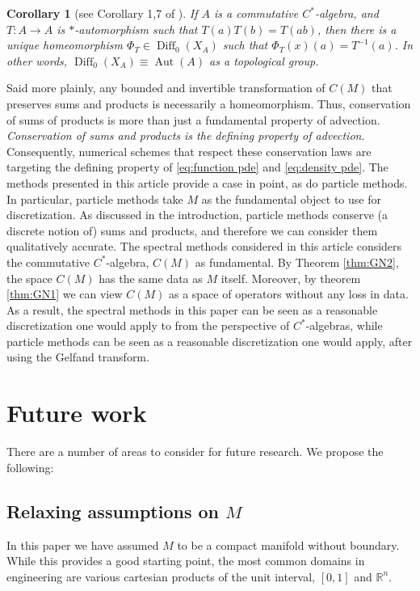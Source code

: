 \documentclass[12pt]{amsart}
\newtheorem{cor}[thm]{Corollary}
\DeclareMathOperator{\Diff}{Diff}
\begin{document}
\begin{cor}[see Corollary 1,7 of \cite{Bondia2001}]
	If $A$ is a commutative $C^{*}$-algebra, and $T:A\to A$ is $*$-automorphism such that $T(a)T(b) = T(ab)$,
	then there is a unique homeomorphism $\Phi_{T} \in \Diff_{0}(X_{A})$
	such that $\Phi_{T}(x) (a) = T^{-1}(a)$.
	In other words, $\Diff_{0}(X_{A}) \equiv \operatorname{Aut}(A)$ as a topological group.
\end{cor}

Said more plainly, any bounded and invertible transformation of $C(M)$ that preserves sums and products is necessarily a homeomorphism.
Thus, conservation of sums of products is more than just a fundamental property of advection.
\emph{Conservation of sums and products is the defining property of advection}.
Consequently, numerical schemes that respect these conservation laws are targeting the defining property of \eqref{eq:function pde} and \eqref{eq:density pde}.
The methods presented in this article provide a case in point, as do particle methods.
In particular, particle methods take $M$ as the fundamental object to use for discretization.
As discussed in the introduction, particle methods conserve (a discrete notion of) sums and products, and therefore we can consider them qualitatively accurate.
The spectral methods considered in this article considers the commutative $C^{*}$-algebra, $C(M)$ as fundamental.
By Theorem \ref{thm:GN2}, the space $C(M)$ has the same data as $M$ itself.
Moreover, by theorem \ref{thm:GN1} we can view $C(M)$ as a space of operators without any loss in data.
As a result, the spectral methods in this paper can be seen as a reasonable discretization one would apply to from the perspective of $C^{*}$-algebras,
while particle methods can be seen as a reasonable discretization one would apply, after using the Gelfand transform.

\section{Future work}
There are a number of areas to consider for future research.  We propose the following:

\subsection{Relaxing assumptions on $M$}
In this paper we have assumed $M$ to be a compact manifold without boundary.
While this provides a good starting point, the most common domains in engineering are various cartesian products of the unit interval, $[0,1]$ and $\mathbb{R}^{n}$.
\end{document}
